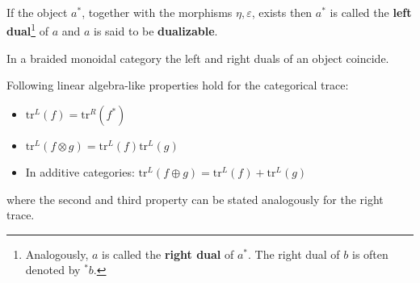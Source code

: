 {{		If the object $a^*$, together with the morphisms $\eta, \varepsilon$, exists then $a^*$ is called the \textbf{left dual}\footnote{Analogously, $a$ is called the \textbf{right dual} of $a^*$. The right dual of $b$ is often denoted by $^*b$.} of $a$ and $a$ is said to be \textbf{dualizable}.
	}
	\begin{property}
		In a braided monoidal category the left and right duals of an object coincide.
	\end{property}
	
	
	\begin{property}
		Following linear algebra-like properties hold for the categorical trace:
		\begin{itemize}
			\item $\text{tr}^L(f) = \text{tr}^R(f^*)$
			\item $\text{tr}^L(f\otimes g) = \text{tr}^L(f)\text{tr}^L(g)$
			\item In additive categories: $\text{tr}^L(f\oplus g) = \text{tr}^L(f) + \text{tr}^L(g)$
		\end{itemize}
		where the second and third property can be stated analogously for the right trace.
	\end{property}
	
}

